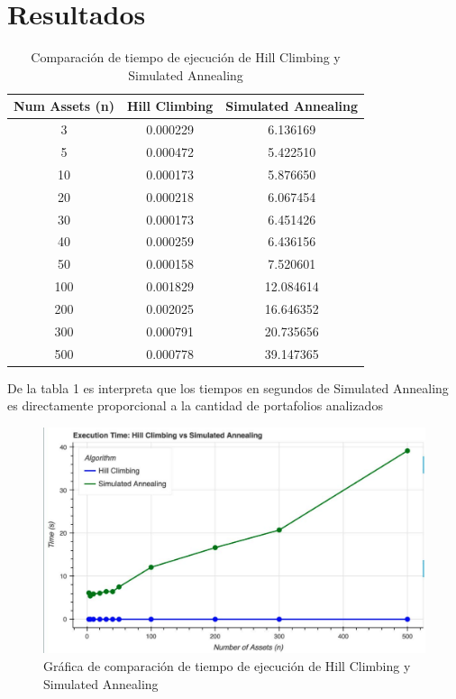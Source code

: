 \documentclass[9pt,a4paper,twoside]{rho-class/rho}
\begin{document}
    \section{Resultados}
        \begin{table}[h]
            \centering
            \begin{tabular}{|c|c|c|}
            \hline
            \textbf{Num Assets (n)} & \textbf{Hill Climbing} & \textbf{Simulated Annealing} \\
            \hline
            3   & 0.000229 & 6.136169 \\
            5   & 0.000472 & 5.422510 \\
            10  & 0.000173 & 5.876650 \\
            20  & 0.000218 & 6.067454 \\
            30  & 0.000173 & 6.451426 \\
            40  & 0.000259 & 6.436156 \\
            50  & 0.000158 & 7.520601 \\
            100 & 0.001829 & 12.084614 \\
            200 & 0.002025 & 16.646352 \\
            300 & 0.000791 & 20.735656 \\
            500 & 0.000778 & 39.147365 \\
            \hline
            \end{tabular}
            \caption{Comparación de tiempo de ejecución de Hill Climbing y Simulated Annealing}
            \label{tab:comparison}
        \end{table}

        De la tabla 1 es interpreta que los tiempos en segundos de Simulated Annealing es directamente proporcional a la cantidad de portafolios analizados


        \begin{figure}[h]
            \centering
            \includegraphics[width=\linewidth]{figures/exe_time.pdf}
            \caption{Gráfica de comparación de tiempo de ejecución de Hill Climbing y Simulated Annealing}
            \label{fig:sample_figure}
        \end{figure}
        
\end{document}

